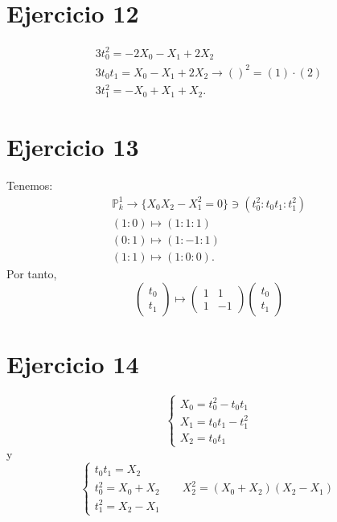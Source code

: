 \documentclass[10pt,a4paper,openright]{book}
\theoremstyle{break}
\begin{document}
\section{Ejercicio 12}%
\label{sec:ejercicio_12_4}
\begin{align*}
    3t_0^2 = -2X_0 - X_1 + 2X_2\\
    3t_0t_1 = X_0 - X_1 + 2X_2 \rightarrow \left(  \right)^2 = (1) \cdot (2)\\
    3t_1^2 = -X_0 + X_1 + X_2
.\end{align*}


\section{Ejercicio 13}%
\label{sec:ejercicio_13_4}
Tenemos:
\begin{align*}
    \mathbb{P}^{1}_{k} \rightarrow \{X_0X_2 - X_1^2 = 0\} \ni \left( t_0^2 : t_0t_1 : t_1^2 \right)\\
    \left( 1 : 0 \right) \mapsto \left( 1 : 1 : 1 \right)\\
    \left( 0 : 1 \right) \mapsto \left( 1 : -1 : 1 \right)\\
    \left( 1 : 1 \right) \mapsto \left( 1 : 0 : 0 \right) 
.\end{align*}
Por tanto,
\[
    \begin{pmatrix} t_0\\ t_1 \end{pmatrix} \mapsto \begin{pmatrix} 1 & 1\\ 1 & -1 \end{pmatrix} \begin{pmatrix} t_0\\ t_1 \end{pmatrix} 
\]

\section{Ejercicio 14}%
\label{sec:ejercicio_14_4}
\[
\begin{cases}
    X_0 = t_0^2 - t_0t_1\\
    X_1 = t_0t_1 - t_1^2\\
    X_2 = t_0t_1
\end{cases} 
\]
y 
\[
\begin{cases}
    t_0t_1 = X_2\\
    t_0^2 = X_0 + X_2\qquad X_2^2 = \left( X_0 + X_2 \right) \left( X_2 - X_1 \right)\\
    t_1^2 = X_2 - X_1
\end{cases} 
\]
\end{document}
